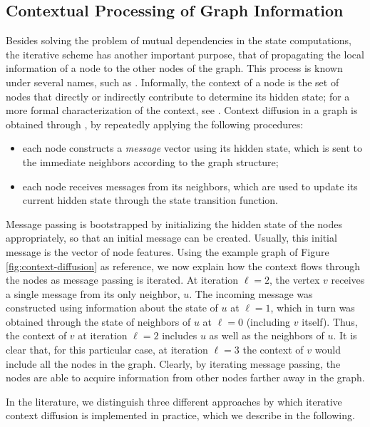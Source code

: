 \subsection{Contextual Processing of Graph Information}
Besides solving the problem of mutual dependencies in the state computations, the iterative scheme has another important purpose, that of propagating the local information of a node to the other nodes of the graph. This process is known under several names, such as . Informally, the context of a node is the set of nodes that directly or indirectly contribute to determine its hidden state; for a more formal characterization of the context, see \citep{micheli2009nn4g}. Context diffusion in a graph is obtained through , \ie by repeatedly applying the following procedures:
\begin{itemize}
    \item each node constructs a \emph{message} vector using its hidden state, which is sent to the immediate neighbors according to the graph structure;
    \item each node receives messages from its neighbors, which are used to update its current hidden state through the state transition function.
\end{itemize}
Message passing is bootstrapped by initializing the hidden state of the nodes appropriately, so that an initial message can be created. Usually, this initial message is the vector of node features. Using the example graph of Figure \ref{fig:context-diffusion} as reference, we now explain how the context flows through the nodes as message passing is iterated. At iteration $\ell=2$, the vertex $v$ receives a single message from its only neighbor, $u$. The incoming message was constructed using information about the state of $u$ at $\ell=1$, which in turn was obtained through the state of neighbors of $u$ at $\ell=0$ (including $v$ itself). Thus, the context of $v$ at iteration $\ell=2$ includes $u$ as well as the neighbors of $u$. It is clear that, for this particular case, at iteration $\ell=3$ the context of $v$ would include all the nodes in the graph. Clearly, by iterating message passing, the nodes are able to acquire information from other nodes farther away in the graph.
\begin{figure*}[h!]
    \centering
    \resizebox{.8\textwidth}{!}{}
    \caption{Context diffusion through message passing. Directed edges represent messages (\eg from node $u$ to $v$ at iteration $\ell=2$). Dashed arrows represent the implicit contextual information received by a node (in dark grey) through the messages from its neighbors (in light grey). Focusing on node $v$, its context at iteration $\ell=2$ is composed all the dark grey nodes (including $v$ itself).}
    \label{fig:context-diffusion}
\end{figure*}
In the literature, we distinguish three different approaches by which iterative context diffusion is implemented in practice, which we describe in the following.

